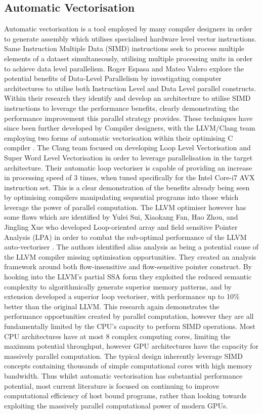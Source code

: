 \subsection{Automatic Vectorisation}
Automatic vectorisation is a tool employed by many compiler designers in order to generate assembly
which utilises specialised hardware level vector instructions.  Same Instruction Multiple Data
(SIMD) instructions seek to process multiple elements of a dataset simultaneously, utilising
multiple processing units in order to achieve data level parallelism. Roger Espasa and Mateo Valero
\cite{espasa1997exploiting} explore the potential benefits of Data-Level Parallelism by
investigating computer architectures to utilise both Instruction Level and Data Level parallel
constructs. Within their research they identify and develop an architecture to utilise SIMD
instructions to leverage the performance benefits, clearly demonstrating the performance improvement
this parallel strategy provides. These techniques have since been further developed by Compiler
designers, with the LLVM/Clang team employing two forms of automatic vectorisation within their
optimising C compiler \cite{website:llvmAutoVectorize}. The Clang team focused on developing Loop
Level Vectorisation and Super Word Level Vectorisation in order to leverage parallelisation in the
target architecture.  Their automatic loop vectoriser is capable of providing an increase in
processing speed of 3 times, when tuned specifically for the Intel Core-i7 AVX instruction set. This
is a clear demonstration of the benefits already being seen by optimising compilers manipulating
sequential programs into those which leverage the power of parallel computation. The LLVM optimiser
however has some flaws which are identified by Yulei Sui, Xiaokang Fan, Hao Zhou, and Jingling Xue
who developed Loop-oriented array and field sensitive Pointer Analysis (LPA) in order to combat the
sub-optimal performance of the LLVM auto-vectoriser \cite{sui2016loop}. The authors identified alias
analysis as being a potential cause of the LLVM compiler missing optimisation opportunities. They
created an analysis framework around both flow-insensitive and flow-sensitive pointer construct. By
hooking into the LLVM’s partial SSA form they exploited the reduced semantic complexity to
algorithmically generate superior memory patterns, and by extension developed a superior loop
vectoriser, with performance up to 10\% better than the original LLVM. This research again
demonstrates the performance opportunities created by parallel computation, however they are all
fundamentally limited by the CPU’s capacity to perform SIMD operations. Most CPU architectures have
at most 8 complex computing cores, limiting the maximum potential throughput, however GPU
architectures have the capacity for massively parallel computation. The typical design inherently
leverage SIMD concepts containing thousands of simple computational cores with high memory
bandwidth. Thus whilst automatic vectorisation has substantial performance potential, most current
literature is focused on continuing to improve computational efficiency of host bound programs,
rather than looking towards exploiting the massively parallel computational power of modern GPUs.

